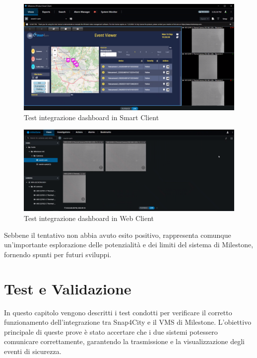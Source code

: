 \documentclass[a4paper, openright, thesis]{report}
\begin{document}
\begin{figure}[H]
    \centering
    \includegraphics[width=1\textwidth]{img/viewclient.png}
    \caption{Test integrazione dashboard in Smart Client}
    \label{23}
\end{figure}
\begin{figure}[H]
    \centering
    \includegraphics[width=1\textwidth]{img/viewweb.png}
    \caption{Test integrazione dashboard in Web Client}
    \label{24}
\end{figure}
\noindent
Sebbene il tentativo non abbia avuto esito positivo, rappresenta comunque un'importante esplorazione delle potenzialità e dei limiti del sistema di Milestone, fornendo spunti per futuri sviluppi.

\chapter{Test e Validazione}
In questo capitolo vengono descritti i test condotti per verificare il corretto funzionamento dell’integrazione tra Snap4City e il VMS di Milestone. L’obiettivo principale di queste prove è stato accertare che i due sistemi potessero comunicare correttamente, garantendo la trasmissione e la visualizzazione degli eventi di sicurezza.
\end{document}
